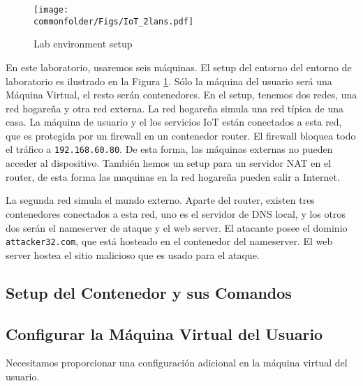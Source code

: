 \begin{figure}[htb]
\centering
\texttt{[image: \\commonfolder/Figs/IoT\_2lans.pdf]}
\caption{Lab environment setup}
\label{rebind:fig:labsetup}
\end{figure}

En este laboratorio, usaremos seis máquinas.
El setup del entorno del entorno de laboratorio es ilustrado en la Figura \ref{rebind:fig:labsetup}. Sólo la máquina del usuario será una Máquina Virtual, el resto serán contenedores.
En el setup, tenemos dos redes, una red hogareña y otra red externa. La red hogareña simula una red típica de una casa. La máquina de usuario y el los servicios IoT están conectados a esta red, que es protegida por un firewall en un contenedor router. El firewall bloquea todo el tráfico  a \texttt{192.168.60.80}. De esta forma, las máquinas externas no pueden acceder al dispositivo.
También hemos un setup para un servidor NAT en el router, de esta forma las maquinas en la red hogareña pueden salir a Internet.

La segunda red simula el mundo externo. Aparte del router, existen tres contenedores conectados a esta red, uno es el servidor de DNS local, y los otros dos serán el nameserver de ataque y el web server.
El atacante posee el dominio \texttt{attacker32.com}, que está hosteado en el contenedor del nameserver. El web server hostea el sitio malicioso que es usado para el ataque.


\subsection{Setup del Contenedor y sus Comandos}






\subsection{Configurar la Máquina Virtual del Usuario}

Necesitamos proporcionar una configuración adicional en la máquina virtual del usuario.


